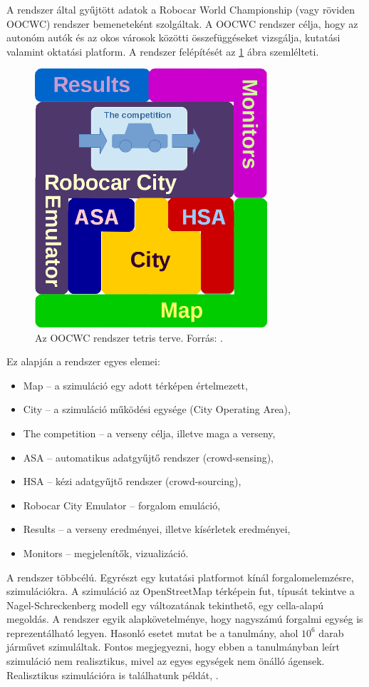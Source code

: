 \documentclass[a4paper,12pt]{report}
\begin{document}
A rendszer által gyűjtött adatok a Robocar World Championship (vagy röviden OOCWC) rendszer bemeneteként szolgáltak. A OOCWC rendszer célja, hogy az autonóm autók és az okos városok közötti összefüggéseket vizsgálja, kutatási valamint oktatási platform. A rendszer felépítését az \ref{basedesign} ábra szemlélteti.

\begin{figure}[h]
\centerline{
\includegraphics[width=3.4in]{img/tetris_plan}}
\caption{Az OOCWC rendszer tetris terve. Forrás: \cite{oocwcrepo}.}
\label{basedesign}
\end{figure}

Ez alapján a rendszer egyes elemei:

\begin{itemize}
\item Map -- a szimuláció egy adott térképen értelmezett,
\item City -- a szimuláció működési egysége (City Operating Area),
\item The competition -- a verseny célja, illetve maga a verseny,
\item ASA -- automatikus adatgyűjtő rendszer (crowd-sensing),
\item HSA -- kézi adatgyűjtő rendszer (crowd-sourcing),
\item Robocar City Emulator -- forgalom emuláció,
\item Results -- a verseny eredményei, illetve kísérletek eredményei,
\item Monitors -- megjelenítők, vizualizáció.
\end{itemize}

A rendszer többcélú. Egyrészt egy kutatási platformot kínál forgalomelemzésre, szimulációkra. A szimuláció az OpenStreetMap \cite{osm} térképein fut, típusát tekintve a Nagel-Schreckenberg modell \cite{nasch} egy változatának tekinthető, egy cella-alapú megoldás. A rendszer egyik alapkövetelménye, hogy nagyszámú forgalmi egység is reprezentálható legyen. Hasonló esetet mutat be a \cite{singapore} tanulmány, ahol $10^6$ darab járművet szimuláltak. Fontos megjegyezni, hogy ebben a tanulmányban leírt szimuláció nem realisztikus, mivel az egyes egységek nem önálló ágensek. Realisztikus szimulációra is találhatunk példát, \cite{realsim}.
\end{document}
